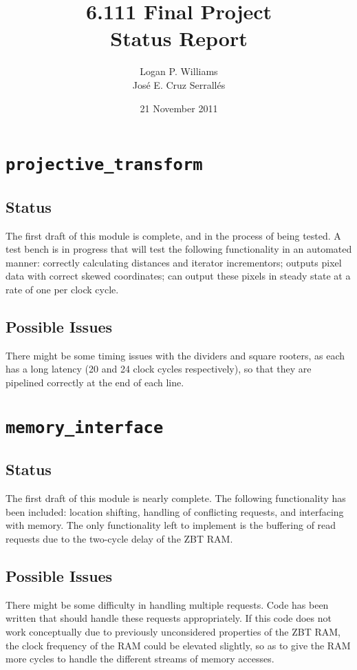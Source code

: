 \documentclass{article}
\title{6.111 Final Project\\Status Report}
\author{Logan P. Williams\\Jos\'{e} E. Cruz Serrall\'{e}s}
\date{21 November 2011}
\begin{document}
\maketitle


\section{{\tt projective\_transform}}
\subsection{Status} The first draft of this module is complete, and in the process of being tested. A test bench is in progress that will test the following functionality in an automated manner: correctly calculating distances and iterator incrementors; outputs pixel data with correct skewed coordinates; can output these pixels in steady state at a rate of one per clock cycle.
\subsection{Possible Issues} There might be some timing issues with the dividers and square rooters, as each has a long latency (20 and 24 clock cycles respectively), so that they are pipelined correctly at the end of each line.

\section{{\tt memory\_interface}}
\subsection{Status} The first draft of this module is nearly complete. The following functionality has been included: location shifting, handling of conflicting requests, and interfacing with memory. The only functionality left to implement is the buffering of read requests due to the two-cycle delay of the ZBT RAM. 
\subsection{Possible Issues} There might be some difficulty in handling multiple requests. Code has been written that should handle these requests appropriately. If this code does not work conceptually due to previously unconsidered properties of the ZBT RAM, the clock frequency of the RAM could be elevated slightly, so as to give the RAM more cycles to handle the different streams of memory accesses.
\end{document}
